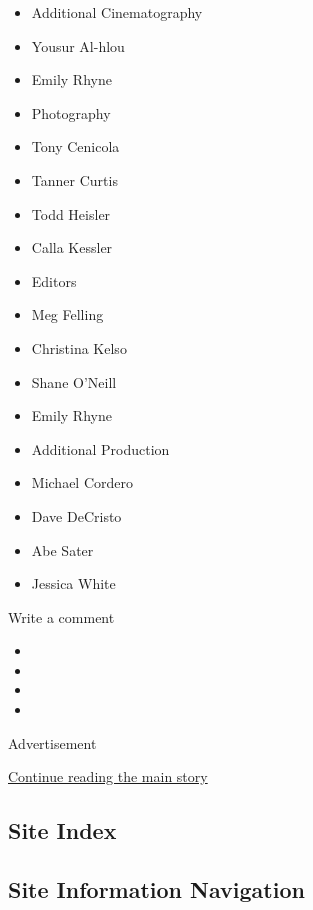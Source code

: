 \begin{itemize}
\tightlist
\item
  Additional Cinematography
\item
  Yousur Al-hlou
\item
  Emily Rhyne
\end{itemize}

\begin{itemize}
\tightlist
\item
  Photography
\item
  Tony Cenicola
\item
  Tanner Curtis
\item
  Todd Heisler
\item
  Calla Kessler
\end{itemize}

\begin{itemize}
\tightlist
\item
  Editors
\item
  Meg Felling
\item
  Christina Kelso
\item
  Shane O'Neill
\item
  Emily Rhyne
\end{itemize}

\begin{itemize}
\tightlist
\item
  Additional Production
\item
  Michael Cordero
\item
  Dave DeCristo
\item
  Abe Sater
\item
  Jessica White
\end{itemize}

Write a comment

\begin{itemize}
\item
\item
\item
\item
\end{itemize}

Advertisement

\protect\hyperlink{after-bottom}{Continue reading the main story}

\hypertarget{site-index}{%
\subsection{Site Index}\label{site-index}}

\hypertarget{site-information-navigation}{%
\subsection{Site Information
Navigation}\label{site-information-navigation}}

